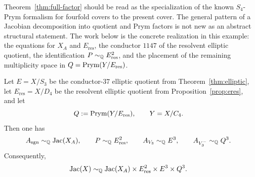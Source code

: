 \begin{remark}\label{rem:fourfold-prym-status}
Theorem~\ref{thm:full-factor} should be read as the specialization of the known \(S_4\)-Prym formalism for fourfold covers to the present cover. The general pattern of a Jacobian decomposition into quotient and Prym factors is not new as an abstract structural statement. The work below is the concrete realization in this example: the equations for \(X_A\) and \(E_{\mathrm{res}}\), the conductor \(1147\) of the resolvent elliptic quotient, the identification \(P\sim_{\mathbb{Q}}E_{\mathrm{res}}^2\), and the placement of the remaining multiplicity space in \(Q=\operatorname{Prym}(Y/E_{\mathrm{res}})\).
\end{remark}

\begin{theorem}\label{thm:full-factor}
Let \(E=X/S_3\) be the conductor-\(37\) elliptic quotient from Theorem~\ref{thm:elliptic}, let \(E_{\mathrm{res}}=X/D_4\) be the resolvent elliptic quotient from Proposition~\ref{prop:eres}, and let
\[
Q:=\operatorname{Prym}(Y/E_{\mathrm{res}}),\qquad Y=X/C_4.
\]
Then one has
\[
A_{\mathrm{sgn}}\sim_{\mathbb{Q}}\operatorname{Jac}(X_A),\qquad
P\sim_{\mathbb{Q}} E_{\mathrm{res}}^2,\qquad
A_{V_3}\sim_{\mathbb{Q}} E^3,\qquad
A_{V_3^-}\sim_{\mathbb{Q}} Q^3.
\]
Consequently,
\[
\operatorname{Jac}(X)\sim_{\mathbb{Q}}\operatorname{Jac}(X_A)\times E_{\mathrm{res}}^2\times E^3\times Q^3.
\]
\end{theorem}

